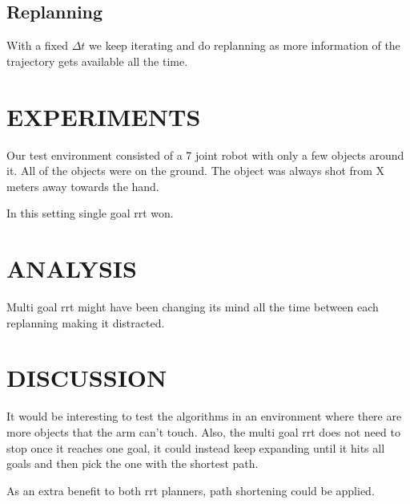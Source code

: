 \documentclass[letterpaper, 10 pt, conference]{ieeeconf}  %
\begin{document}
\subsection{Replanning}

With a fixed $\Delta t$ we keep iterating and do replanning as more information
of the trajectory gets available all the time.

\section{EXPERIMENTS}

Our test environment consisted of a 7 joint robot with only a few
objects around it. All of the objects were on the ground. The object was
always shot from X meters away towards the hand.

In this setting single goal rrt won.

\section{ANALYSIS}

Multi goal rrt might have been changing its mind all the time between each replanning making it distracted.

\section{DISCUSSION}

It would be interesting to test the algorithms in an environment where there
are more objects that the arm can't touch. Also, the multi goal rrt does not
need to stop once it reaches one goal, it could instead keep expanding until it
hits all goals and then pick the one with the shortest path.

As an extra benefit to both rrt planners, path shortening could be applied.







\end{document}

